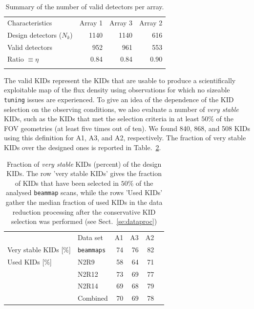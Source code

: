 \documentclass[traditionalabstract]{aa}
\newcommand{\lp}[1]{#1}
\begin{document}
{\begin{table}[!htbp]
  \begin{center}
    \caption[Number of detectors]{Summary of the number of valid detectors per array.}
    \label{tab:number_of_kids}  
    \begin{tabular}{lrrr}
      \hline
      \hline
      \noalign{\smallskip}
      Characteristics & Array 1 & Array 3  & Array 2  \\
      \noalign{\smallskip}
      \hline
      \noalign{\smallskip}
      Design detectors ($N_k$)  & 1140  & 1140   & 616  \\
      Valid detectors           & 952   & 961    & 553  \\ 
      Ratio $\equiv \eta$       & 0.84  & 0.84   & 0.90   \\
      \noalign{\smallskip}
      \hline
    \end{tabular}
  \end{center}    
\end{table}


The valid KIDs represent the KIDs
that are usable to produce a scientifically exploitable map of the flux
density using observations for which no sizeable {\tt tuning}
issues are experienced. 
{\lp To give an idea of the dependence of the KID selection on the
observing conditions,} we also
evaluate a number of \emph{very stable} KIDs, such as the KIDs that met the
selection criteria in at least {\lp $50\%$} of the FOV geometries (at least
five times out of {\lp ten}). We
found 840, 868, and 508 KIDs using this definition for A1, A3, and A2,
respectively. The fraction of very stable KIDs over the designed ones
is reported in Table.~\ref{tab:eta_used}.

\begin{table}[!htbp]
  \centering
  \caption[]{Fraction of \emph{very stable} KIDs (percent) of the design
  KIDs. The row 'very stable KIDs' gives the fraction of KIDs that have been selected
  in {\lp $50\%$} of the analysed {\tt beammap} scans, while the rows 'Used KIDs' gather
  the median fraction of used KIDs in the data reduction processing
  after the conservative KID selection was performed (see Sect.~\ref{se:dataproc})}
  \label{tab:eta_used}
  \begin{tabular}{llrrrr}
    \hline\hline
    \noalign{\smallskip}
    &  Data set   & A1      &   A3    &     A2 \\
    \noalign{\smallskip}
    \hline
    \noalign{\smallskip}
    Very stable KIDs [\%] & {\tt beammaps} & 74  &  76  &  82  \\
    \hline
    \noalign{\smallskip}
    Used KIDs [\%]  & N2R9     & 58 &  64  & 71 \\
               & N2R12    & 73 &  69  & 77 \\
               & N2R14    & 69 &  68  & 79 \\
               & Combined & 70 &  69  & 78 \\
    \hline
  \end{tabular}
\end{table}

}
\end{document}
